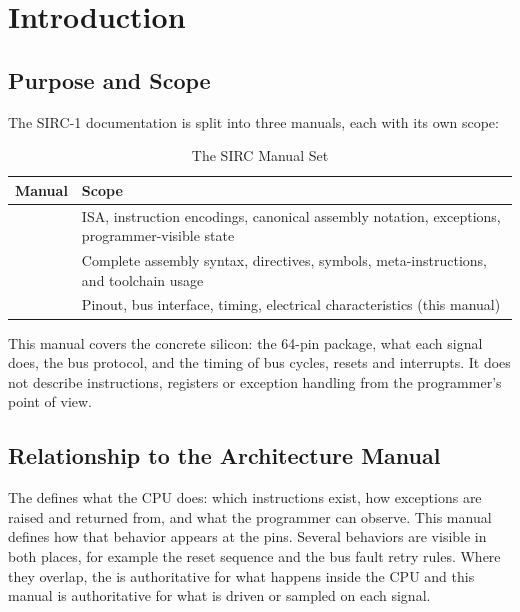 \chapter{Introduction}
\label{ch:introduction}

\section{Purpose and Scope}

The SIRC-1 documentation is split into three manuals, each with its own scope:

\begin{table}[H]
	\centering
	\begin{tabular}{lp{9cm}}
		\toprule
		\textbf{Manual} & \textbf{Scope}                                                                                \\
		\midrule
		\archmanual{}   & ISA, instruction encodings, canonical assembly notation, exceptions, programmer-visible state \\
		\asmmanual{}    & Complete assembly syntax, directives, symbols, meta-instructions, and toolchain usage         \\
		\hwmanual{}     & Pinout, bus interface, timing, electrical characteristics (this manual)                       \\
		\bottomrule
	\end{tabular}
	\caption{The SIRC Manual Set}
	\label{tab:manual-set}
\end{table}

This manual covers the concrete silicon: the 64-pin package, what each signal does, the bus protocol, and the timing of
bus cycles, resets and interrupts. It does not describe instructions, registers or exception handling from the
programmer's point of view.

\section{Relationship to the Architecture Manual}

The \archmanual{} defines what the CPU does: which instructions exist, how exceptions are raised and returned from, and
what the programmer can observe. This manual defines how that behavior appears at the pins. Several behaviors are
visible in both places, for example the reset sequence and the bus fault retry rules. Where they overlap, the
\archmanual{} is authoritative for what happens inside the CPU and this manual is authoritative for what is driven or
sampled on each signal.


